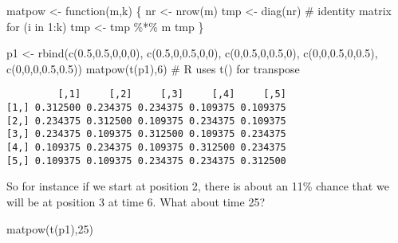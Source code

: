 \documentclass[
  letterpaper,
  DIV=11,
  numbers=noendperiod,
  oneside]{scrreprt}
\newenvironment{Shaded}{\begin{snugshade}}{\end{snugshade}}
\newcommand{\CommentTok}[1]{\textcolor[rgb]{0.37,0.37,0.37}{#1}}
\newcommand{\ControlFlowTok}[1]{\textcolor[rgb]{0.00,0.23,0.31}{#1}}
\newcommand{\DecValTok}[1]{\textcolor[rgb]{0.68,0.00,0.00}{#1}}
\newcommand{\FloatTok}[1]{\textcolor[rgb]{0.68,0.00,0.00}{#1}}
\newcommand{\FunctionTok}[1]{\textcolor[rgb]{0.28,0.35,0.67}{#1}}
\newcommand{\NormalTok}[1]{\textcolor[rgb]{0.00,0.23,0.31}{#1}}
\newcommand{\OtherTok}[1]{\textcolor[rgb]{0.00,0.23,0.31}{#1}}
\newcommand{\SpecialCharTok}[1]{\textcolor[rgb]{0.37,0.37,0.37}{#1}}
\begin{document}
\begin{Shaded}
\begin{Highlighting}[]
\NormalTok{matpow }\OtherTok{\textless{}{-}} \ControlFlowTok{function}\NormalTok{(m,k) \{}
\NormalTok{   nr }\OtherTok{\textless{}{-}} \FunctionTok{nrow}\NormalTok{(m)}
\NormalTok{   tmp }\OtherTok{\textless{}{-}} \FunctionTok{diag}\NormalTok{(nr)  }\CommentTok{\# identity matrix}
   \ControlFlowTok{for}\NormalTok{ (i }\ControlFlowTok{in} \DecValTok{1}\SpecialCharTok{:}\NormalTok{k) tmp }\OtherTok{\textless{}{-}}\NormalTok{ tmp }\SpecialCharTok{\%*\%}\NormalTok{ m}
\NormalTok{   tmp}
\NormalTok{\}}

\NormalTok{p1 }\OtherTok{\textless{}{-}} \FunctionTok{rbind}\NormalTok{(}\FunctionTok{c}\NormalTok{(}\FloatTok{0.5}\NormalTok{,}\FloatTok{0.5}\NormalTok{,}\DecValTok{0}\NormalTok{,}\DecValTok{0}\NormalTok{,}\DecValTok{0}\NormalTok{), }\FunctionTok{c}\NormalTok{(}\FloatTok{0.5}\NormalTok{,}\DecValTok{0}\NormalTok{,}\FloatTok{0.5}\NormalTok{,}\DecValTok{0}\NormalTok{,}\DecValTok{0}\NormalTok{), }\FunctionTok{c}\NormalTok{(}\DecValTok{0}\NormalTok{,}\FloatTok{0.5}\NormalTok{,}\DecValTok{0}\NormalTok{,}\FloatTok{0.5}\NormalTok{,}\DecValTok{0}\NormalTok{), }
   \FunctionTok{c}\NormalTok{(}\DecValTok{0}\NormalTok{,}\DecValTok{0}\NormalTok{,}\FloatTok{0.5}\NormalTok{,}\DecValTok{0}\NormalTok{,}\FloatTok{0.5}\NormalTok{), }\FunctionTok{c}\NormalTok{(}\DecValTok{0}\NormalTok{,}\DecValTok{0}\NormalTok{,}\DecValTok{0}\NormalTok{,}\FloatTok{0.5}\NormalTok{,}\FloatTok{0.5}\NormalTok{))}
\FunctionTok{matpow}\NormalTok{(}\FunctionTok{t}\NormalTok{(p1),}\DecValTok{6}\NormalTok{) }\CommentTok{\# R uses t() for transpose}
\end{Highlighting}
\end{Shaded}

\begin{verbatim}
         [,1]     [,2]     [,3]     [,4]     [,5]
[1,] 0.312500 0.234375 0.234375 0.109375 0.109375
[2,] 0.234375 0.312500 0.109375 0.234375 0.109375
[3,] 0.234375 0.109375 0.312500 0.109375 0.234375
[4,] 0.109375 0.234375 0.109375 0.312500 0.234375
[5,] 0.109375 0.109375 0.234375 0.234375 0.312500
\end{verbatim}

So for instance if we start at position 2, there is about an 11\% chance
that we will be at position 3 at time 6. What about time 25?

\begin{Shaded}
\begin{Highlighting}[]
\FunctionTok{matpow}\NormalTok{(}\FunctionTok{t}\NormalTok{(p1),}\DecValTok{25}\NormalTok{)}
\end{Highlighting}
\end{Shaded}
\end{document}
